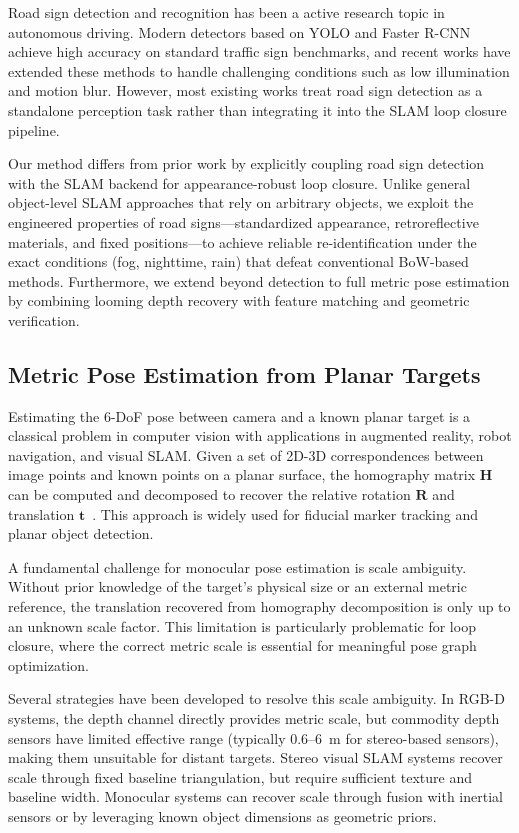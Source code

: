 \documentclass[runningheads]{llncs}
\begin{document}
Road sign detection and recognition has been a active research topic in autonomous
driving. Modern detectors based on YOLO and Faster R-CNN achieve high accuracy
on standard traffic sign benchmarks, and recent works have extended these methods
to handle challenging conditions such as low illumination and motion blur.
However, most existing works treat road sign detection as a standalone perception
task rather than integrating it into the SLAM loop closure pipeline.

Our method differs from prior work by explicitly coupling road sign detection with
the SLAM backend for appearance-robust loop closure. Unlike general object-level
SLAM approaches that rely on arbitrary objects, we exploit the engineered properties
of road signs---standardized appearance, retroreflective materials, and fixed
positions---to achieve reliable re-identification under the exact conditions (fog,
nighttime, rain) that defeat conventional BoW-based methods. Furthermore, we
extend beyond detection to full metric pose estimation by combining looming depth
recovery with feature matching and geometric verification.

\subsection{Metric Pose Estimation from Planar Targets}

Estimating the 6-DoF pose between camera and a known planar target is a classical
problem in computer vision with applications in augmented reality, robot navigation,
and visual SLAM. Given a set of 2D-3D correspondences between image points and
known points on a planar surface, the homography matrix $\mathbf{H}$ can be computed
and decomposed to recover the relative rotation $\mathbf{R}$ and translation $\mathbf{t}$~\cite{Duda2018}.
This approach is widely used for fiducial marker tracking and planar object detection.

A fundamental challenge for monocular pose estimation is scale ambiguity. Without
prior knowledge of the target's physical size or an external metric reference, the
translation recovered from homography decomposition is only up to an unknown
scale factor. This limitation is particularly problematic for loop closure, where the
correct metric scale is essential for meaningful pose graph optimization.

Several strategies have been developed to resolve this scale ambiguity. In RGB-D
systems, the depth channel directly provides metric scale, but commodity depth
sensors have limited effective range (typically 0.6--6~m for stereo-based sensors),
making them unsuitable for distant targets. Stereo visual SLAM systems recover
scale through fixed baseline triangulation, but require sufficient texture and baseline
width. Monocular systems can recover scale through fusion with inertial sensors
or by leveraging known object dimensions as geometric priors.
\end{document}
